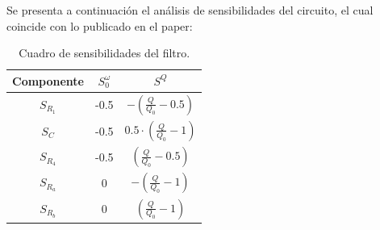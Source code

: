 Se presenta a continuación el análisis de sensibilidades del circuito, el cual coincide con lo publicado en el paper: 
\begin{table}[H]
\centering
\begin{tabular}{ccc}
\hline
Componente & $S^\omega_0$ & $S^Q$                                      \\ \hline
$S_{R_1}$  & -0.5         & $-\left( \frac{Q}{Q_0} -0.5 \right)$       \\
$S_{C}$    & -0.5         & $0.5\cdot \left( \frac{Q}{Q_0} -1 \right)$ \\
$S_{R_4}$  & -0.5         & $\left( \frac{Q}{Q_0} -0.5 \right)$        \\
$S_{R_a}$  & 0            & $-\left( \frac{Q}{Q_0} -1 \right)$         \\
$S_{R_b}$  & 0            & $\left( \frac{Q}{Q_0} -1 \right)$         \\
\hline
\end{tabular}
\caption{Cuadro de sensibilidades del filtro.}
\label{tab:sensibilidad}
\end{table}

